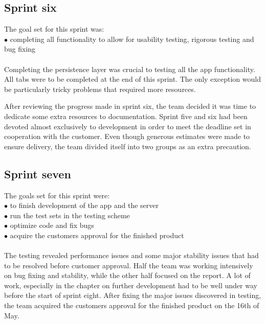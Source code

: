 \subsection{Sprint six}
The goal set for this sprint was:\\
$\bullet$\hspace{0.25cm} completing all functionality to allow for usability testing, rigorous testing and bug fixing\\\\
Completing the persistence layer was crucial to testing all the app functionality. All tabs were to be completed at the end of this sprint. The only exception would be particularly tricky problems that required more resources.

After reviewing the progress made in sprint six, the team decided it was time to dedicate some extra resources to documentation. Sprint five and six had been devoted almost exclusively to development in order to meet the deadline set in cooperation with the customer. Even though generous estimates were made to ensure delivery, the team divided itself into two groups as an extra precaution. 

\subsection{Sprint seven}
The goals set for this sprint were:\\
$\bullet$\hspace{0.25cm} to finish development of the app and the server\\
$\bullet$\hspace{0.25cm} run the test sets in the testing scheme\\
$\bullet$\hspace{0.25cm} optimize code and fix bugs\\
$\bullet$\hspace{0.25cm} acquire the customers approval for the finished product\\\\
The testing revealed performance issues and some major stability issues that had to be resolved before customer approval. Half the team was working intensively on bug fixing and stability, while the other half focused on the report. A lot of work, especially in the chapter on further development had to be well under way before the start of sprint eight. After fixing the major issues discovered in testing, the team acquired the customers approval for the finished product on the 16th of May.

